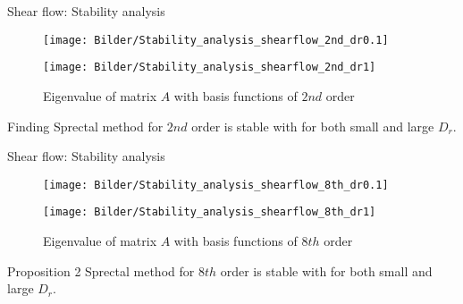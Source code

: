 \begin{frame}{Shear flow: Stability analysis}
	\begin{figure}
		\centering
		\begin{minipage}{0.4\linewidth}
			\texttt{[image: Bilder/Stability\_analysis\_shearflow\_2nd\_dr0.1]}
		\end{minipage}
		\hspace{1cm}
		\begin{minipage}{0.4\linewidth}
			\centering
			\texttt{[image: Bilder/Stability\_analysis\_shearflow\_2nd\_dr1]}
		\end{minipage}
		\caption{Eigenvalue of matrix $A$ with basis functions of $2nd$ order}
	\end{figure}
	
	\begin{block}{Finding}
		Sprectal method for $2nd$ order is stable with for both small and large $D_r$.
	\end{block}
\end{frame}

\begin{frame}{Shear flow: Stability analysis}
	\begin{figure}
		\centering
		\begin{minipage}{0.4\linewidth}
			\texttt{[image: Bilder/Stability\_analysis\_shearflow\_8th\_dr0.1]}
		\end{minipage}
		\hspace{1cm}
		\begin{minipage}{0.4\linewidth}
			\centering
			\texttt{[image: Bilder/Stability\_analysis\_shearflow\_8th\_dr1]}
		\end{minipage}
		\caption{Eigenvalue of matrix $A$ with basis functions of $8th$ order}
	\end{figure}
	
	\begin{block}{Proposition 2}
		Sprectal method for $8th$ order is stable with for both small and large $D_r$.
	\end{block}
\end{frame}






